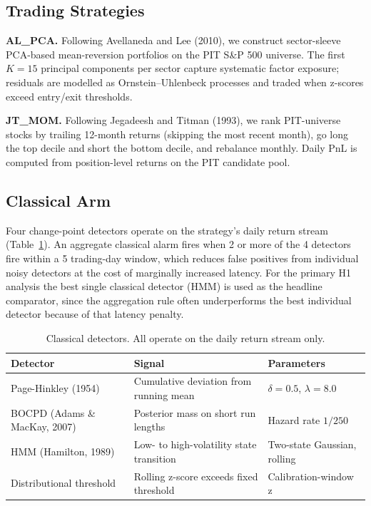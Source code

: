 \documentclass[11pt,a4paper]{article}
\begin{document}
\subsection{Trading Strategies}\label{sec:method-strategies}

\textbf{AL\_PCA.} Following Avellaneda and Lee (2010), we construct sector-sleeve
PCA-based mean-reversion portfolios on the PIT S\&P 500 universe. The first
$K = 15$ principal components per sector capture systematic factor exposure;
residuals are modelled as Ornstein--Uhlenbeck processes and traded when z-scores
exceed entry/exit thresholds.

\textbf{JT\_MOM.} Following Jegadeesh and Titman (1993), we rank PIT-universe
stocks by trailing 12-month returns (skipping the most recent month), go long
the top decile and short the bottom decile, and rebalance monthly. Daily PnL is
computed from position-level returns on the PIT candidate pool.

\subsection{Classical Arm}\label{sec:method-classical}

Four change-point detectors operate on the strategy's daily return stream
(Table~\ref{tab:detectors}). An aggregate classical alarm fires when 2 or more of
the 4 detectors fire within a 5 trading-day window, which reduces false positives
from individual noisy detectors at the cost of marginally increased latency. For
the primary H1 analysis the best single classical detector (HMM) is used as the
headline comparator, since the aggregation rule often underperforms the best
individual detector because of that latency penalty.

\begin{table}[htbp]
\centering
\footnotesize
\caption{Classical detectors. All operate on the daily return stream only.}
\label{tab:detectors}
\begin{tabular}{lll}
\toprule
Detector & Signal & Parameters \\
\midrule
Page-Hinkley (1954)        & Cumulative deviation from running mean & $\delta = 0.5$, $\lambda = 8.0$ \\
BOCPD (Adams \& MacKay, 2007) & Posterior mass on short run lengths & Hazard rate $1/250$ \\
HMM (Hamilton, 1989)       & Low- to high-volatility state transition & Two-state Gaussian, rolling \\
Distributional threshold   & Rolling z-score exceeds fixed threshold & Calibration-window z \\
\bottomrule
\end{tabular}
\end{table}
\end{document}
